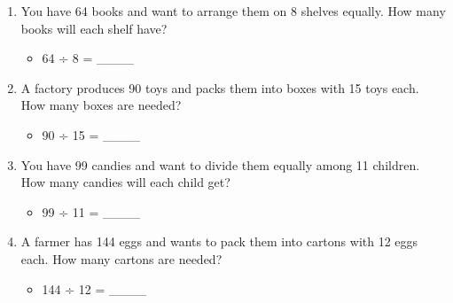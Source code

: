 \begin{enumerate}
\begin{itemize}
    \end{itemize}
    \item You have 64 books and want to arrange them on 8 shelves equally. How many books will each shelf have?
    \begin{itemize}
        \item 64 ÷ 8 = \_\_\_\_
    \end{itemize}
    \item A factory produces 90 toys and packs them into boxes with 15 toys each. How many boxes are needed?
    \begin{itemize}
        \item 90 ÷ 15 = \_\_\_\_
    \end{itemize}
    \item You have 99 candies and want to divide them equally among 11 children. How many candies will each child get?
    \begin{itemize}
        \item 99 ÷ 11 = \_\_\_\_
    \end{itemize}
    \item A farmer has 144 eggs and wants to pack them into cartons with 12 eggs each. How many cartons are needed?
    \begin{itemize}
        \item 144 ÷ 12 = \_\_\_\_
    \end{itemize}
\end{enumerate}
